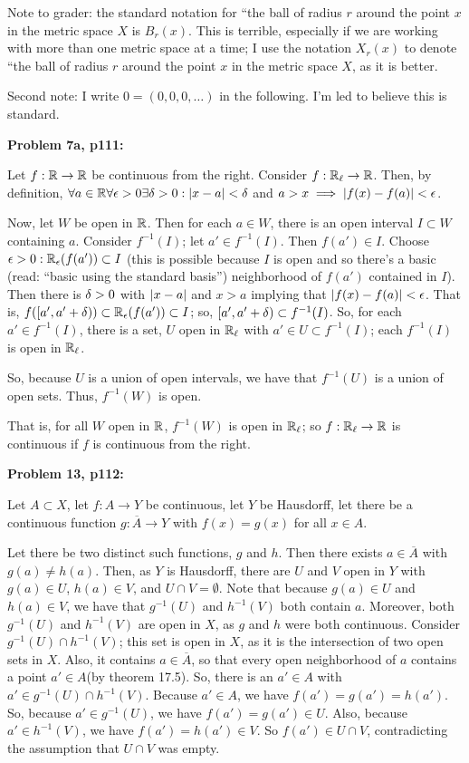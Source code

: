 \documentclass[a4paper,12pt]{article}
\begin{document}
Note to grader: the standard notation for ``the ball of radius $r$ around the point $x$ in the metric space $X$ is $B_r(x)$. This is terrible, especially if we are working with more than one metric space at a time; I use the notation $X_r(x)$ to denote ``the ball of radius $r$ around the point $x$ in the metric space $X$, as it is better.

Second note: I write $0 = (0,0,0,\ldots )$ in the following. I'm led to believe this is standard.

{\bf Problem 7a, p111:}

Let $f: \mathbb{R} \to \mathbb{R}$ be continuous from the right. Consider $f: \mathbb{R}_{\ell} \to \mathbb{R}$. Then, by definition, $\forall a \in \mathbb{R}\forall \epsilon >0 \exists \delta > 0 : \left\lvert x-a \right\rvert < \delta$ and $a > x \implies \left\lvert f(x) - f(a) \right\rvert < \epsilon$.

Now, let $W$ be open in $\mathbb{R}$. Then for each $a \in W$, there is an open interval $I \subset W$ containing $a$. Consider $f^{-1}(I)$; let $a' \in f^{-1}(I)$. Then $f(a') \in I$. Choose $\epsilon >0: \mathbb{R}_{\epsilon}(f(a')) \subset I$ (this is possible because $I$ is open and so there's a basic (read: ``basic using the standard basis'') neighborhood of $f(a')$ contained in $I$). Then there is $\delta>0$ with $\left\lvert x-a \right\rvert$ and $x >a$ implying that $\left\lvert f(x) - f(a) \right\rvert < \epsilon$. That is, $f([a', a'+ \delta)) \subset \mathbb{R}_{\epsilon}(f(a')) \subset I$; so, $[a',a'+\delta) \subset f^{-1}(I)$. So, for each $a' \in f^{-1}(I)$, there is a set, $U$ open in $\mathbb{R}_\ell$ with $a' \in U \subset f^{-1}(I)$; each $f^{-1}(I)$ is open in $\mathbb{R}_\ell$.

So, because $U$ is a union of open intervals, we have that $f^{-1}(U)$ is a union of open sets. Thus, $f^{-1}(W)$ is open.

That is, for all $W$ open in $\mathbb{R}$, $f^{-1}(W)$ is open in $\mathbb{R}_{\ell}$; so $f: \mathbb{R}_\ell \to \mathbb{R}$ is continuous if $f$ is continuous from the right.

\shunt

{\bf Problem 13, p112:}

Let $A \subset X$, let $f: A \to Y$ be continuous, let $Y$ be Hausdorff, let there be a continuous function $g: \overline{A} \to Y$ with $f(x) = g(x)$ for all $x \in A$.

Let there be two distinct such functions, $g$ and $h$. Then there exists $a \in \overline{A}$ with $g(a) \neq h(a)$. Then, as $Y$ is Hausdorff, there are $U$ and $V$ open in $Y$ with $g(a) \in U$, $h(a) \in V$, and $U \cap V = \emptyset$. Note that because $g(a) \in U$ and $h(a) \in V$, we have that $g^{-1}(U)$ and $h^{-1}(V)$ both contain $a$. Moreover, both $g^{-1}(U)$ and $h^{-1}(V)$ are open in $X$, as $g$ and $h$ were both continuous. Consider $g^{-1}(U) \cap h^{-1}(V)$; this set is open in $X$, as it is the intersection of two open sets in $X$. Also, it contains $a \in \overline{A}$, so that every open neighborhood of $a$ contains a point $a' \in A$(by theorem 17.5). So, there is an $a' \in A$ with $a' \in g^{-1}(U) \cap h^{-1}(V)$. Because $a' \in A$, we have $f(a') = g(a') = h(a')$. So, because $a' \in g^{-1}(U)$, we have $f(a') = g(a') \in U$. Also, because $a' \in h^{-1}(V)$, we have $f(a') = h(a') \in V$. So $f(a') \in U \cap V$, contradicting the assumption that $U \cap V$ was empty.
\end{document}
